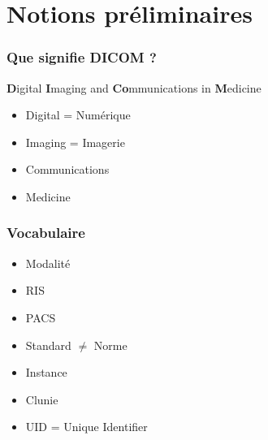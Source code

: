 \section{Notions pr\'eliminaires}

	\frame
	{
		\frametitle{Que signifie DICOM ?}
		
		\textbf{D}igital \textbf{I}maging and \textbf{Co}mmunications in \textbf{M}edicine
		\begin{itemize}
			\item<2-> Digital = Num\'erique
		    	\item<3-> Imaging = Imagerie
		    	\item<4-> Communications
		    	\item<4-> Medicine
		\end{itemize}
	}
	
	\frame
	{
		\frametitle{Vocabulaire}
		\begin{itemize}
			\item<1-> Modalit\'e
			\item<2-> RIS
			\item<3-> PACS
			\item<4-> Standard $\neq$ Norme
			\item<5-> Instance
			\item<6-> Clunie
			\item<7-> UID = Unique Identifier
		\end{itemize}
	}
	
